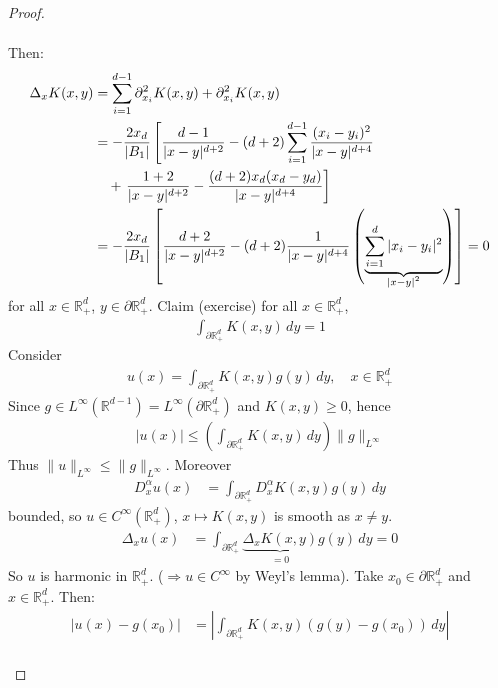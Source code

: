 \documentclass{report}
\theoremstyle{tommy}
\begin{document}
\begin{proof}
\begin{itemize}
\begin{align*}
      \end{align*}
      Then: \begin{align*}
        \Delta_x K(x,y) 
        &= \sum_{i=1}^{d-1} \partial_{x_i}^2 K(x,y) + \partial_{x_i}^2 K(x,y) \\
        &= - \frac{2 x_d}{|B_1|} \left[\frac{d-1}{|x-y|^{d+2}} - (d+2) \sum_{i=1}^{d-1} \frac{(x_i - y_i)^2}{|x-y|^{d+4}} \right. \\
        &\quad + \left. \frac{1+2}{|x-y|^{d+2}} - \frac{(d+2)x_d(x_d-y_d)}{|x-y|^{d+4}}\right] \\
        &= - \frac{2 x_d}{|B_1|} \left[\frac{d+2}{|x-y|^{d+2}} - (d+2) \frac{1}{|x-y|^{d+4}} \left(\underbrace{\sum_{i=1}^d |x_i - y_i|^2}_{\smash{|x-y|^2}}\right)\right] = 0
      \end{align*}
      for all \(x \in \mathbb{R}_+^d\), \(y \in \partial \mathbb{R}_+^d\).
      Claim (exercise) for all \(x \in \mathbb{R}_+^d\), 
      \begin{align*}
        \int_{\partial \mathbb{R}_+^d} K(x,y) \, dy = 1 
      \end{align*}
      Consider 
      \begin{align*}
        u(x) = \int_{\partial \mathbb{R}_+^d} K(x,y) g(y) \, dy, \quad x \in \mathbb{R}_+^d
      \end{align*}
      Since \(g \in L^\infty(\mathbb{R}^{d-1}) = L^\infty(\partial \mathbb{R}_+^d)\) and \(K(x,y) \ge 0\), hence 
      \begin{align*}
        |u(x)| \le \left(\int_{\partial \mathbb{R}_+^d} K(x,y) \, dy\right) \|g\|_{L^\infty}
      \end{align*}
      Thus \(\|u\|_{L^\infty} \le \|g\|_{L^\infty}\). Moreover 
      \begin{align*}
        D_x^\alpha u(x) &= \int_{\partial \mathbb{R}_+^d} D_x^\alpha K(x,y) g(y) \, dy
      \end{align*}
      bounded, so \(u \in C^\infty(\mathbb{R}_+^d)\), \(x \mapsto K(x,y)\) is smooth as \(x \ne y\).
      \begin{align*}
        \Delta_x u(x) &= \int_{\partial \mathbb{R}_+^d} \underbrace{\Delta_x K(x,y)}_{= 0} g(y) \, dy = 0
      \end{align*}
      So \(u\) is harmonic in \(\mathbb{R}^d_+\). (\(\Rightarrow u \in C^\infty\) by Weyl's lemma). Take \(x_0 \in \partial \mathbb{R}_+^d\) and \(x \in \mathbb{R}_+^d\). Then:
      \begin{align*}
        |u(x)-g(x_0)| 
        &= \left| \int_{\partial \mathbb{R}_+^d} K(x,y)(g(y) - g(x_0)) \, dy \right| \\

\end{align*}
\end{itemize}
\end{proof}
\end{document}

